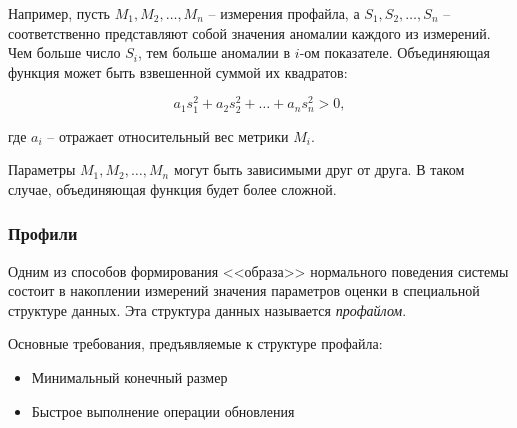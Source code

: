 Например, пусть $M_1, M_2, \dots, M_n$ -- измерения профайла, а $S_1, S_2, \dots, S_n$ -- соответственно представляют собой значения аномалии каждого из измерений. Чем больше число $S_i$, тем больше аномалии в $i$-ом показателе. Объединяющая функция может быть взвешенной суммой их квадратов:

\begin{equation}
	a_1s_1^2 + a_2s_2^2 + \dots + a_ns_n^2 > 0,
\end{equation}

где $a_i$ -- отражает относительный вес метрики $M_i$.

Параметры $M_1, M_2, \dots, M_n$ могут быть зависимыми друг от друга. В таком случае, объединяющая функция будет более сложной.

\subsubsection*{Профили}

Одним из способов формирования <<образа>> нормального поведения системы состоит в накоплении измерений значения параметров оценки в специальной структуре данных. Эта структура данных называется \textit{профайлом}. 

Основные требования, предъявляемые к структуре профайла:
\begin{itemize}
	\item Минимальный конечный размер
	\item Быстрое выполнение операции обновления
\end{itemize}

